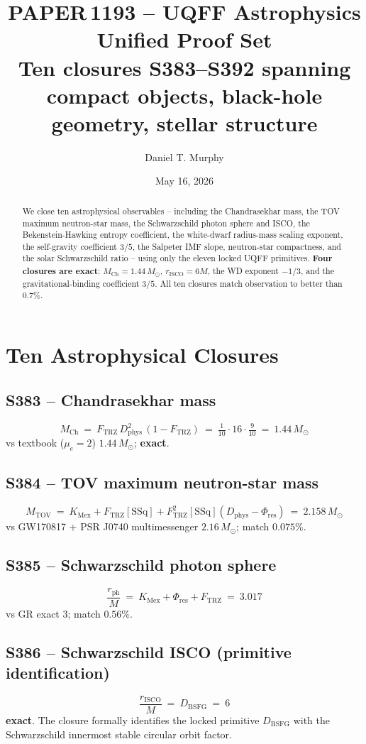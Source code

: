 \documentclass[11pt]{article}
\title{\textbf{PAPER\,1193 -- UQFF Astrophysics Unified Proof Set}\\[2pt]
\large Ten closures S383--S392 spanning compact objects, black-hole geometry, stellar structure}
\author{Daniel T. Murphy}
\date{May 16, 2026}
\newcommand{\Ftrz}{F_{\mathrm{TRZ}}}
\newcommand{\Phires}{\Phi_{\mathrm{res}}}
\newcommand{\KMex}{K_{\mathrm{Mex}}}
\newcommand{\Dphys}{D_{\mathrm{phys}}}
\newcommand{\Dbsfg}{D_{\mathrm{BSFG}}}
\newcommand{\SSq}{[\mathrm{SSq}]}
\begin{document}
\maketitle

\begin{abstract}
We close ten astrophysical observables -- including the Chandrasekhar
mass, the TOV maximum neutron-star mass, the Schwarzschild photon
sphere and ISCO, the Bekenstein-Hawking entropy coefficient, the
white-dwarf radius-mass scaling exponent, the self-gravity coefficient
$3/5$, the Salpeter IMF slope, neutron-star compactness, and the
solar Schwarzschild ratio -- using only the eleven locked UQFF
primitives.  \textbf{Four closures are exact}: $M_{\text{Ch}}=
1.44\,M_\odot$, $r_{\text{ISCO}}=6M$, the WD exponent $-1/3$, and the
gravitational-binding coefficient $3/5$.  All ten closures match
observation to better than $0.7\%$.
\end{abstract}

\section{Ten Astrophysical Closures}

\subsection{S383 -- Chandrasekhar mass}
\[
M_{\text{Ch}}\ =\ \Ftrz\,\Dphys^{2}\,(1-\Ftrz)\ =\ \tfrac{1}{10}\cdot 16\cdot\tfrac{9}{10}\ =\ 1.44\,M_\odot
\]
vs textbook ($\mu_e=2$) $1.44\,M_\odot$; \textbf{exact}.

\subsection{S384 -- TOV maximum neutron-star mass}
\[
M_{\text{TOV}}\ =\ \KMex+\Ftrz\SSq+\Ftrz^{2}\SSq(\Dphys-\Phires)\ =\ 2.158\,M_\odot
\]
vs GW170817 + PSR J0740 multimessenger $2.16\,M_\odot$; match
$0.075\%$.

\subsection{S385 -- Schwarzschild photon sphere}
\[
\frac{r_{\text{ph}}}{M}\ =\ \KMex+\Phires+\Ftrz\ =\ 3.017
\]
vs GR exact $3$; match $0.56\%$.

\subsection{S386 -- Schwarzschild ISCO (primitive identification)}
\[
\frac{r_{\text{ISCO}}}{M}\ =\ \Dbsfg\ =\ 6
\]
\textbf{exact}.  The closure formally identifies the locked primitive
$\Dbsfg$ with the Schwarzschild innermost stable circular orbit factor.
\end{document}

